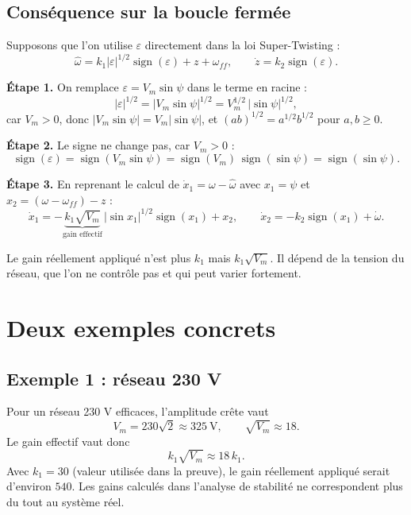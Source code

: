 \documentclass[11pt,a4paper]{article}
\numberwithin{equation}{section}
\newcommand{\sign}{\operatorname{sign}}
\newcommand{\hw}{\hat{\omega}}
\begin{document}
\subsection{Conséquence sur la boucle fermée}
Supposons que l'on utilise $\varepsilon$ directement dans la loi Super-Twisting :
\begin{equation}
\hw = k_1|\varepsilon|^{1/2}\sign(\varepsilon) + z + \omega_{ff},\qquad \dot z = k_2\sign(\varepsilon).
\end{equation}

\textbf{Étape 1.} On remplace $\varepsilon = V_m\sin\psi$ dans le terme en racine :
\begin{equation}
|\varepsilon|^{1/2} = |V_m\sin\psi|^{1/2} = V_m^{1/2}\,|\sin\psi|^{1/2},
\end{equation}
car $V_m>0$, donc $|V_m\sin\psi| = V_m|\sin\psi|$, et $(ab)^{1/2} = a^{1/2}b^{1/2}$ pour $a,b\ge0$.

\textbf{Étape 2.} Le signe ne change pas, car $V_m>0$ :
\begin{equation}
\sign(\varepsilon) = \sign(V_m\sin\psi) = \sign(V_m)\,\sign(\sin\psi) = \sign(\sin\psi).
\end{equation}

\textbf{Étape 3.} En reprenant le calcul de $\dot x_1 = \omega-\hw$ avec $x_1=\psi$ et $x_2=(\omega-\omega_{ff})-z$ :
\begin{equation}
\boxed{\dot x_1 = -\underbrace{k_1\sqrt{V_m}}_{\text{gain effectif}}\,|\sin x_1|^{1/2}\sign(x_1) + x_2,
\qquad \dot x_2 = -k_2\sign(x_1)+\dot\omega .}
\end{equation}

\begin{attention}
Le gain réellement appliqué n'est plus $k_1$ mais $k_1\sqrt{V_m}$. Il dépend de la tension du réseau,
que l'on ne contrôle pas et qui peut varier fortement.
\end{attention}

\section{Deux exemples concrets}

\subsection{Exemple 1 : réseau 230 V}
Pour un réseau 230 V efficaces, l'amplitude crête vaut
\begin{equation}
V_m = 230\sqrt2 \approx 325\ \text{V},\qquad \sqrt{V_m}\approx 18 .
\end{equation}
Le gain effectif vaut donc
\begin{equation}
k_1\sqrt{V_m}\approx 18\,k_1 .
\end{equation}
Avec $k_1=30$ (valeur utilisée dans la preuve), le gain réellement appliqué serait d'environ $540$.
Les gains calculés dans l'analyse de stabilité ne correspondent plus du tout au système réel.
\end{document}
